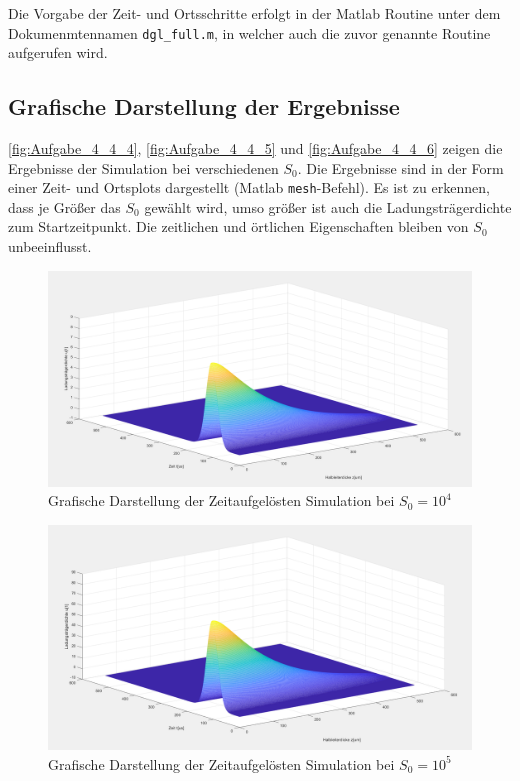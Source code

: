 \documentclass[
	pagesize,
	fontsize=12pt,
	paper=a4,
	oneside,
   reqno
]{scrartcl}
\begin{document}
Die Vorgabe der Zeit- und Ortsschritte erfolgt in der Matlab Routine unter dem Dokumenmtennamen \texttt{dgl\_full.m}, in welcher auch die zuvor genannte Routine aufgerufen wird.

\subsection{Grafische Darstellung der Ergebnisse}

\autoref{fig:Aufgabe_4_4_4}, \autoref{fig:Aufgabe_4_4_5} und \autoref{fig:Aufgabe_4_4_6} zeigen die Ergebnisse der Simulation bei verschiedenen $S_0$. Die Ergebnisse sind in der Form einer Zeit- und Ortsplots dargestellt (Matlab \texttt{mesh}-Befehl). Es ist zu erkennen, dass je Größer das $S_0$ gewählt wird, umso größer ist auch die Ladungsträgerdichte zum Startzeitpunkt. Die zeitlichen und örtlichen Eigenschaften bleiben von $S_0$ unbeeinflusst.

\begin{figure}[H]
   \centering
   \includegraphics[width=1\textwidth]{Bilder/Aufgabe_4_4_4.png}
   \caption[Lösung bei $S_0 = 10^4$]{Grafische Darstellung der Zeitaufgelösten Simulation bei $S_0 = 10^4$}
   \label{fig:Aufgabe_4_4_4}
\end{figure}

\begin{figure}[H]
   \centering
   \includegraphics[width=1\textwidth]{Bilder/Aufgabe_4_4_5.png}
   \caption[Lösung bei $S_0 = 10^5$]{Grafische Darstellung der Zeitaufgelösten Simulation bei $S_0 = 10^5$}
   \label{fig:Aufgabe_4_4_5}
\end{figure}
\end{document}
